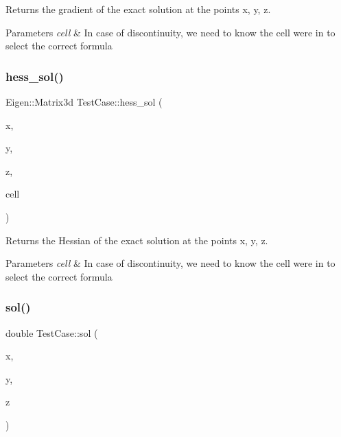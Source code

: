 Returns the gradient of the exact solution at the points x, y, z. 


\begin{DoxyParams}{Parameters}
{\em cell} & In case of discontinuity, we need to know the cell we\textquotesingle{}re in to select the correct formula \\
\hline
\end{DoxyParams}
\mbox{\label{classTestCase_a433ec3de5f6f54f5dadc75fcc18efb37}} 
\subsubsection{\texorpdfstring{hess\+\_\+sol()}{hess\_sol()}}
{\footnotesize\ttfamily Eigen\+::\+Matrix3d Test\+Case\+::hess\+\_\+sol (\begin{DoxyParamCaption}\item[{const double}]{x,  }\item[{const double}]{y,  }\item[{const double}]{z,  }\item[{const \hyperlink{classHArDCore3D_1_1Cell}{Cell} $\ast$}]{cell }\end{DoxyParamCaption})}



Returns the Hessian of the exact solution at the points x, y, z. 


\begin{DoxyParams}{Parameters}
{\em cell} & In case of discontinuity, we need to know the cell we\textquotesingle{}re in to select the correct formula \\
\hline
\end{DoxyParams}
\mbox{\label{classTestCase_ac33657413d3b2af32c65ac8153137ff4}} 
\subsubsection{\texorpdfstring{sol()}{sol()}}
{\footnotesize\ttfamily double Test\+Case\+::sol (\begin{DoxyParamCaption}\item[{const double}]{x,  }\item[{const double}]{y,  }\item[{const double}]{z }\end{DoxyParamCaption})}



